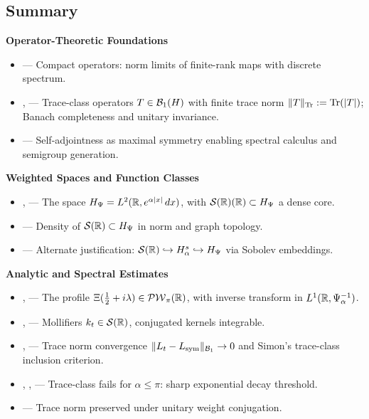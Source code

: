 \subsection*{Summary}
\label{sec:foundations_summary}

\textbf{Operator-Theoretic Foundations}
\begin{itemize}
  \item {} — Compact operators: norm limits of finite-rank maps with discrete spectrum.
  \item {},  — Trace-class operators \( T \in \mathcal{B}_1(H) \) with finite trace norm \( \|T\|_{\operatorname{Tr}} := \operatorname{Tr}(|T|) \); Banach completeness and unitary invariance.
  \item {} — Self-adjointness as maximal symmetry enabling spectral calculus and semigroup generation.
\end{itemize}

\textbf{Weighted Spaces and Function Classes}
\begin{itemize}
  \item {},  — The space \( H_{\Psi} = L^2(\mathbb{R}, e^{\alpha|x|}\,dx) \), with \( \mathcal{S}(\mathbb{R})(\mathbb{R}) \subset H_{\Psi} \) a dense core.
  \item {} — Density of \( \mathcal{S}(\mathbb{R}) \subset H_{\Psi} \) in norm and graph topology.
  \item {} — Alternate justification: \( \mathcal{S}(\mathbb{R}) \hookrightarrow H^s_\alpha \hookrightarrow H_{\Psi} \) via Sobolev embeddings.
\end{itemize}

\textbf{Analytic and Spectral Estimates}
\begin{itemize}
  \item {},  — The profile \( \Xi(\tfrac{1}{2} + i\lambda) \in \mathcal{PW}_{\pi}(\mathbb{R}) \), with inverse transform in \( L^1(\mathbb{R}, \Psi_\alpha^{-1}) \).
  \item {},  — Mollifiers \( k_t \in \mathcal{S}(\mathbb{R}) \), conjugated kernels integrable.
  \item {},  — Trace norm convergence \( \|L_t - L_{\mathrm{sym}}\|_{\mathcal{B}_1} \to 0 \) and Simon’s trace-class inclusion criterion.
  \item {}, ,  — Trace-class fails for \( \alpha \le \pi \): sharp exponential decay threshold.
  \item {} — Trace norm preserved under unitary weight conjugation.
\end{itemize}


